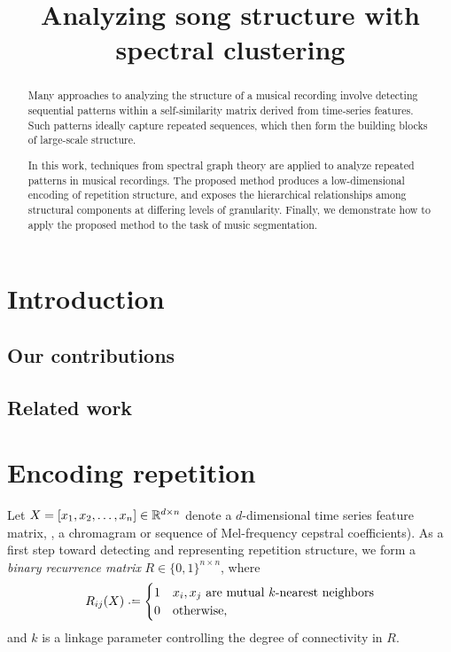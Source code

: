 \documentclass{article}
\title{Analyzing song structure with spectral clustering}
\begin{document}
%
\maketitle
%
\begin{abstract}
Many approaches to analyzing the structure of a musical recording involve detecting
sequential patterns within a self-similarity matrix derived from time-series features.
Such patterns ideally capture repeated sequences, which then form the building blocks
of large-scale structure.

In this work, techniques from spectral graph theory are applied to analyze repeated
patterns in musical recordings.  The proposed method produces a low-dimensional
encoding of repetition structure, and exposes the hierarchical relationships among
structural components at differing levels of granularity.  Finally, we demonstrate how
to apply the proposed method to the task of music segmentation.
\end{abstract}
%
\section{Introduction}\label{sec:introduction}

\subsection{Our contributions}

\subsection{Related work}

\cite{mauch2009using}

\cite{serra2012unsupervised}

\cite{grohganz2013converting}

\section{Encoding repetition}

Let $X = [x_1, x_2, \dots, x_n] \in \mathbb{R}^{d\times n}$ denote a $d$-dimensional time
series feature matrix, \eg, a chromagram or sequence of Mel-frequency cepstral 
coefficients).  As a first step toward detecting and representing repetition structure, 
we form a \emph{binary recurrence matrix} $R \in \{0,1\}^{n\times n}$, where 
\begin{equation}
R_{ij}(X) \defeq \begin{cases}
1 & x_i, x_j \text{ are mutual $k$-nearest neighbors}\\
0 & \text{otherwise},
\end{cases}
\end{equation}
and $k$ is a linkage parameter controlling the degree of connectivity in $R$.
\end{document}
